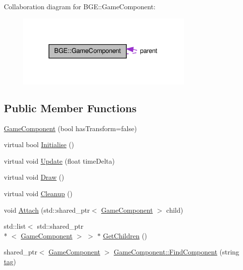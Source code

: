 Collaboration diagram for B\-G\-E\-:\-:Game\-Component\-:
\nopagebreak
\begin{figure}[H]
\begin{center}
\leavevmode
\includegraphics[width=249pt]{class_b_g_e_1_1_game_component__coll__graph}
\end{center}
\end{figure}
\subsection*{Public Member Functions}
\begin{DoxyCompactItemize}
\item 
\hyperlink{class_b_g_e_1_1_game_component_a17c5036ab1a5a94b2edc052926e9a5bb}{Game\-Component} (bool has\-Transform=false)
\item 
virtual bool \hyperlink{class_b_g_e_1_1_game_component_ae1c2340cdfb31d2cd372323d3f9a1ba4}{Initialise} ()
\item 
virtual void \hyperlink{class_b_g_e_1_1_game_component_ac8e444827ee0be9ad654cdff4d15f071}{Update} (float time\-Delta)
\item 
virtual void \hyperlink{class_b_g_e_1_1_game_component_a697cd151f92fa23cbae10afb9130f291}{Draw} ()
\item 
virtual void \hyperlink{class_b_g_e_1_1_game_component_a901ea3686345268c40037c0786caa568}{Cleanup} ()
\item 
void \hyperlink{class_b_g_e_1_1_game_component_ab857b613dca4b962205a399f8b3e3630}{Attach} (std\-::shared\-\_\-ptr$<$ \hyperlink{class_b_g_e_1_1_game_component}{Game\-Component} $>$ child)
\item 
std\-::list$<$ std\-::shared\-\_\-ptr\\*
$<$ \hyperlink{class_b_g_e_1_1_game_component}{Game\-Component} $>$ $>$ $\ast$ \hyperlink{class_b_g_e_1_1_game_component_a5d92260b2091eb37a7a4290e74999677}{Get\-Children} ()
\item 
shared\-\_\-ptr$<$ \hyperlink{class_b_g_e_1_1_game_component}{Game\-Component} $>$ \hyperlink{class_b_g_e_1_1_game_component_af070d0c6c05f61179dc96817b005d434}{Game\-Component\-::\-Find\-Component} (string \hyperlink{class_b_g_e_1_1_game_component_a7934229e91ebc58e91c6393860df70ee}{tag})
\end{DoxyCompactItemize}
